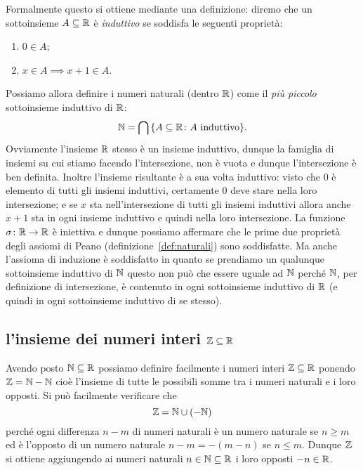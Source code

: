 Formalmente questo si ottiene mediante una definizione:
diremo che un sottoinsieme $A\subseteq {\mathbb R}$ è \emph{induttivo}
se soddisfa le seguenti proprietà:
%
%
\begin{enumerate}
  \item $0\in A$;
  \item $x\in A \implies x+1 \in A$.
\end{enumerate}

Possiamo allora definire i numeri naturali (dentro ${\mathbb R}$) come 
il \emph{più piccolo} sottoinsieme induttivo di ${\mathbb R}$:
\[
 {\mathbb N} = \bigcap{\left\{ A\subseteq{\mathbb R}\colon \text{$A$ induttivo} \right\}}.  
\]
Ovviamente l'insieme ${\mathbb R}$ stesso è un insieme induttivo, 
dunque la famiglia di insiemi su cui stiamo facendo l'intersezione,
non è vuota e dunque l'intersezione è ben definita.
Inoltre l'insieme risultante è a sua volta induttivo:
visto che $0$ è elemento di tutti gli insiemi induttivi, 
certamente $0$ deve stare nella loro intersezione; 
e se $x$ sta nell'intersezione di tutti gli insiemi induttivi 
allora anche $x+1$ sta in ogni insieme induttivo e quindi 
nella loro intersezione. 
La funzione $\sigma\colon {\mathbb R}\to{\mathbb R}$ è iniettiva e dunque 
possiamo affermare che le prime due proprietà degli assiomi 
di Peano (definizione~\ref{def:naturali}) sono soddisfatte.
Ma anche l'assioma di induzione è soddisfatto in quanto 
se prendiamo un qualunque sottoinsieme induttivo di ${\mathbb N}$ 
questo non può che essere uguale ad ${\mathbb N}$ perché ${\mathbb N}$, 
per definizione di intersezione, è contenuto in ogni 
sottoinsieme induttivo di ${\mathbb R}$ (e quindi in ogni 
sottoinsieme induttivo di se stesso).


\subsection{l'insieme dei numeri interi ${\mathbb Z} \subseteq {\mathbb R}$}
%
%
%
%
\index{$\ZZ$}%

Avendo posto ${\mathbb N}\subseteq {\mathbb R}$ possiamo definire facilmente i numeri interi
${\mathbb Z} \subseteq {\mathbb R}$ 
ponendo ${\mathbb Z} = {\mathbb N} - {\mathbb N}$
cioè l'insieme di tutte le possibili somme tra i numeri naturali 
e i loro opposti. Si può facilmente verificare che 
\[
 {\mathbb Z} = {\mathbb N} \cup (-{\mathbb N})  
\]
perché ogni differenza $n-m$ di numeri naturali 
è un numero naturale se $n\ge m$ ed è l'opposto 
di un numero naturale $n-m = -(m-n)$ se $n\le m$.
Dunque $\ZZ$ si ottiene aggiungendo ai numeri naturali 
$n\in {\mathbb N}\subseteq {\mathbb R}$ i loro opposti $-n\in {\mathbb R}$.

